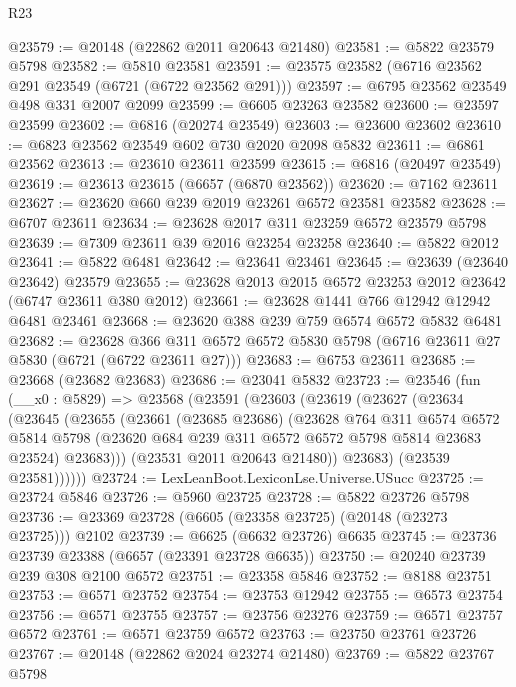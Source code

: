 \begin{lexlean}{R23}
\begin{coremodule}
@23579 := @20148 (@22862 @2011 @20643 @21480)
@23581 := @5822 @23579 @5798
@23582 := @5810 @23581
@23591 := @23575 @23582 (@6716 @23562 @291 @23549 (@6721 (@6722 @23562 @291)))
@23597 := @6795 @23562 @23549 @498 @331 @2007 @2099
@23599 := @6605 @23263 @23582
@23600 := @23597 @23599
@23602 := @6816 (@20274 @23549)
@23603 := @23600 @23602
@23610 := @6823 @23562 @23549 @602 @730 @2020 @2098 @5832
@23611 := @6861 @23562
@23613 := @23610 @23611 @23599
@23615 := @6816 (@20497 @23549)
@23619 := @23613 @23615 (@6657 (@6870 @23562))
@23620 := @7162 @23611
@23627 := @23620 @660 @239 @2019 @23261 @6572 @23581 @23582
@23628 := @6707 @23611
@23634 := @23628 @2017 @311 @23259 @6572 @23579 @5798
@23639 := @7309 @23611 @39 @2016 @23254 @23258
@23640 := @5822 @2012
@23641 := @5822 @6481
@23642 := @23641 @23461
@23645 := @23639 (@23640 @23642) @23579
@23655 := @23628 @2013 @2015 @6572 @23253 @2012 @23642 (@6747 @23611 @380 @2012)
@23661 := @23628 @1441 @766 @12942 @12942 @6481 @23461
@23668 := @23620 @388 @239 @759 @6574 @6572 @5832 @6481
@23682 := @23628
    @366
    @311
    @6572
    @6572
    @5830
    @5798
    (@6716 @23611 @27 @5830 (@6721 (@6722 @23611 @27)))
@23683 := @6753 @23611
@23685 := @23668 (@23682 @23683)
@23686 := @23041 @5832
@23723 := @23546
    (fun (__x0 : @5829) =>
    @23568
      (@23591
        (@23603
          (@23619
            (@23627
              (@23634
                (@23645
                  (@23655
                    (@23661
                      (@23685 @23686)
                      (@23628
                        @764
                        @311
                        @6574
                        @6572
                        @5814
                        @5798
                        (@23620 @684 @239 @311 @6572 @6572 @5798 @5814 @23683 @23524)
                        @23683)))
                  (@23531 @2011 @20643 @21480))
                @23683)
              (@23539 @23581))))))
@23724 := LexLeanBoot.LexiconLse.Universe.USucc
@23725 := @23724 @5846
@23726 := @5960 @23725
@23728 := @5822 @23726 @5798
@23736 := @23369 @23728 (@6605 (@23358 @23725) (@20148 (@23273 @23725))) @2102
@23739 := @6625 (@6632 @23726) @6635
@23745 := @23736 @23739 @23388 (@6657 (@23391 @23728 @6635))
@23750 := @20240 @23739 @239 @308 @2100 @6572
@23751 := @23358 @5846
@23752 := @8188 @23751
@23753 := @6571 @23752
@23754 := @23753 @12942
@23755 := @6573 @23754
@23756 := @6571 @23755
@23757 := @23756 @23276
@23759 := @6571 @23757 @6572
@23761 := @6571 @23759 @6572
@23763 := @23750 @23761 @23726
@23767 := @20148 (@22862 @2024 @23274 @21480)
@23769 := @5822 @23767 @5798

\end{coremodule}
\end{lexlean}
